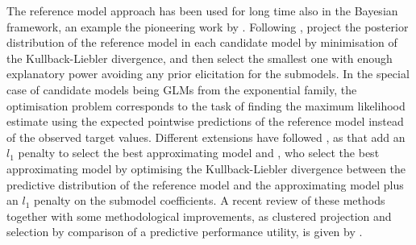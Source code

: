\documentclass[american,]{article}
\theoremstyle{definition}
\begin{document}
The reference model approach has been used for long time also in the Bayesian framework, an example the pioneering work by \cite{paper:reference_lindley}. Following \cite{goutis1998model}, \cite{paper:original_proj} project the posterior distribution of the reference model in each candidate model by minimisation of the Kullback-Liebler divergence, and then select the smallest one with enough explanatory power avoiding any prior elicitation for the submodels. In the special case of candidate models being GLMs from the exponential family, the optimisation problem corresponds to the task of finding the maximum likelihood estimate using the expected pointwise predictions of the reference model instead of the observed target values. Different extensions have followed \cite{paper:original_proj}, as \cite{nott2010bayesian} that add an $l_{1}$ penalty to select the best approximating model and \cite{tran2012predictive}, who select the best approximating model by optimising the Kullback-Liebler divergence between the predictive distribution of the reference model and the approximating model plus an $l_{1}$ penalty on the submodel coefficients. A recent review of these methods together with some methodological improvements, as clustered projection and selection by comparison of a predictive performance utility, is given by \cite{paper:projpred}.

\end{document}
